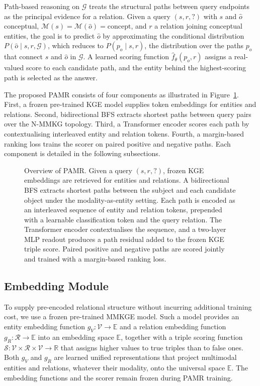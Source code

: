 \documentclass[runningheads]{llncs}
\begin{document}
Path-based reasoning on $\mathcal{G}$ treats the structural paths
between query endpoints as the principal evidence for a relation. Given
a query $(s, r, ?)$ with $s$ and $\hat{o}$ conceptual,
$\mathcal{M}(s) = \mathcal{M}(\hat{o}) = \text{concept}$, and $r$ a
relation joining conceptual entities, the goal is to predict $\hat{o}$ by
approximating the conditional distribution $P(\hat{o} \mid s, r,
\mathcal{G})$, which reduces to $P(p_o \mid s, r)$, the distribution
over the paths $p_o$ that connect $s$ and $\hat{o}$ in $\mathcal{G}$. A
learned scoring function $\hat{f}_\theta(p_o, r)$ assigns a real-valued
score to each candidate path, and the entity behind the highest-scoring
path is selected as the answer.

The proposed PAMR consists of four components as illustrated in
Figure~\ref{fig:overview}. First, a frozen pre-trained KGE model supplies
token embeddings for entities and relations. Second, bidirectional BFS
extracts shortest paths between query pairs over the N-MMKG topology.
Third, a Transformer encoder scores each path by contextualising
interleaved entity and relation tokens. Fourth, a margin-based ranking
loss trains the scorer on paired positive and negative paths. Each
component is detailed in the following subsections.

\begin{figure}[t]
  \centering
  
  \caption{Overview of PAMR. Given a query $(s, r, ?)$, frozen KGE embeddings are retrieved for entities and relations. A bidirectional BFS extracts shortest paths between the subject and each candidate object under the modality-as-entity setting. Each path is encoded as an interleaved sequence of entity and relation tokens, prepended with a learnable classification token and the query relation. The Transformer encoder contextualises the sequence, and a two-layer MLP readout produces a path residual added to the frozen KGE triple score. Paired positive and negative paths are scored jointly and trained with a margin-based ranking loss.}
  \label{fig:overview}
\end{figure}

\subsection{Embedding Module}
\label{sec:embedding-module}

To supply pre-encoded relational structure without incurring additional
training cost, we use a frozen pre-trained MMKGE model. Such a model
provides an entity embedding function $g_V: \mathcal{V} \rightarrow
\mathbb{E}$ and a relation embedding function $g_R: \mathcal{R}
\rightarrow \mathbb{E}$ into an embedding space $\mathbb{E}$, together
with a triple scoring function $\mathcal{S}: \mathcal{V} \times
\mathcal{R} \times \mathcal{V} \rightarrow \mathbb{R}$ that assigns
higher values to true triples than to false ones. Both $g_V$ and $g_R$
are learned unified representations that project multimodal entities
and relations, whatever their modality, onto the universal space
$\mathbb{E}$. The embedding functions and the scorer remain frozen
during PAMR training.
\end{document}
